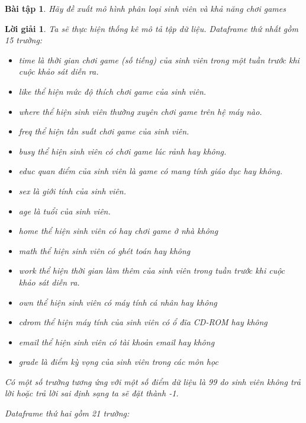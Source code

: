 \documentclass[14pt, a4paper]{article}
\theoremstyle{sltheorem}
\newtheorem{baitap}{Bài tập}
\theoremstyle{soltheorem}
\newtheorem*{loigiai}{Lời giải}
\begin{document}
\begin{baitap}
    Hãy đề xuất mô hình phân loại sinh viên và khả năng chơi games
\end{baitap}

\begin{loigiai}
    Ta sẽ thực hiện thống kê mô tả tập dữ liệu.
    Dataframe thứ nhất gồm 15 trường:

    \begin{itemize}
        \item time là thời gian chơi game (số tiếng) của sinh viên trong một tuần trước khi cuộc khảo sát diễn ra.
        \item like thể hiện mức độ thích chơi game của sinh viên.
        \item where thể hiện sinh viên thường xuyên chơi game trên hệ máy nào.
        \item freq thể hiện tần suất chơi game của sinh viên.
        \item busy thể hiện sinh viên có chơi game lúc rảnh hay không.
        \item educ quan điểm của sinh viên là game có mang tính giáo dục hay không.
        \item sex là giới tính của sinh viên.
        \item age là tuổi của sinh viên.
        \item home thể hiện sinh viên có hay chơi game ở nhà không
        \item math thể hiện sinh viên có ghét toán hay không
        \item work thể hiện thời gian làm thêm của sinh viên trong tuần trước khi cuộc khảo sát diễn ra.
        \item own thể hiện sinh viên có máy tính cá nhân hay không
        \item cdrom thể hiện máy tính của sinh viên có ổ đĩa CD-ROM hay không
        \item email thể hiện sinh viên có tài khoản email hay không
        \item grade là điểm kỳ vọng của sinh viên trong các môn học
    \end{itemize}

    Có một số trường tương ứng với một số điểm dữ liệu là 99 do sinh viên không trả lời hoặc trả lời sai định sạng ta sẽ đặt thành -1.

    Dataframe thứ hai gồm 21 trường:


\end{loigiai}
\end{document}
